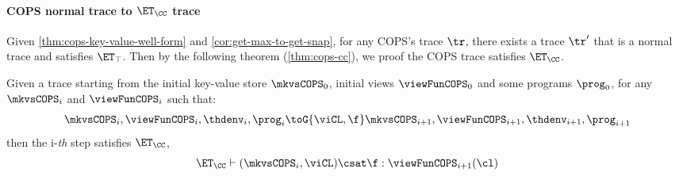 \paragraph{\bf COPS normal trace to \( \ET_\CC \) trace}
Given \cref{thm:cops-key-value-well-form} and \cref{cor:get-max-to-get-snap}, for any COPS's trace \( \tr \), 
there exists a trace \( \tr' \) that is a normal trace and satisfies \( \ET_\top \).
Then by the following theorem (\cref{thm:cops-cc}), we proof the COPS trace satisfies \( \ET_\CC \).

\begin{theorem}
    \label{thm:cops-cc}
    Given a trace starting from the initial key-value store \( \mkvsCOPS_0 \), initial views \( \viewFunCOPS_0 \) and some programs \( \prog_0 \), for any \( \mkvsCOPS_i \) and \( \viewFunCOPS_i \)  such that: 
    \[
        \mkvsCOPS_i, \viewFunCOPS_i, \thdenv_i, \prog_i \toG{\viCL,\f} \mkvsCOPS_{i+1}, \viewFunCOPS_{i+1}, \thdenv_{i+1}, \prog_{i+1} 
    \]
    then the i-\emph{th} step satisfies \( \ET_\CC \), \ie
    \[
        \ET_\CC \vdash ( \mkvsCOPS_i, \viCL ) \csat \f : \viewFunCOPS_{i+1}(\cl)
    \]
\end{theorem}
